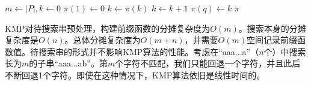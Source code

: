 \documentclass[b5paper]{ctexart}
\begin{document}
\begin{algorithmic}[1]
  \State $m \gets |P|, k \gets 0$
  \State $\pi(1) \gets 0$
      \State $k \gets \pi(k)$
    \EndWhile
      \State $k \gets k + 1$
    \EndIf
    \State $\pi(q) \gets k$
  \EndFor
  \State \Return $\pi$
\EndFunction
\end{algorithmic}

KMP对待搜索串预处理，构建前缀函数的分摊复杂度为$O(m)$\cite{CLRS}。搜索本身的分摊复杂度是$O(n)$。总体分摊复杂度为$O(m + n)$，并需要$O(m)$空间记录前缀函数值。待搜索串的形式并不影响KMP算法的性能。考虑在“aaa...a”（$n$个）中搜索长为$m$的子串“aaa...ab”。第$m$个字符不匹配，我们只能回退一个字符，并且此后不断回退1个字符。即使在这种情况下，KMP算法依旧是线性时间的。






\end{document}
